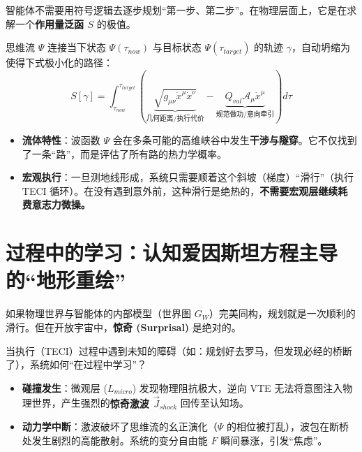 
智能体不需要用符号逻辑去逐步规划“第一步、第二步”。在物理层面上，它是在求解一个\textbf{作用量泛函 $S$} 的极值。

\begin{definition}[规划作用量方程]
    思维流 $\Psi$ 连接当下状态 $\Psi(\tau_{now})$ 与目标状态 $\Psi(\tau_{target})$ 的轨迹 $\gamma$，自动坍缩为使得下式极小化的路径：
    $$ S[\gamma] = \int_{\tau_{now}}^{\tau_{target}} \left( \underbrace{\sqrt{g_{\mu\nu} \dot{x}^\mu \dot{x}^\nu}}_{\text{几何距离/执行代价}} - \underbrace{Q_{val} \mathcal{A}_\mu \dot{x}^\mu}_{\text{规范做功/意向牵引}} \right) d\tau $$
\end{definition}

\begin{itemize}
    \item \textbf{流体特性}：波函数 $\Psi$ 会在多条可能的高维峡谷中发生\textbf{干涉与隧穿}。它不仅找到了一条“路”，而是评估了所有路的热力学概率。
    \item \textbf{宏观执行}：一旦测地线形成，系统只需要顺着这个斜坡（梯度）“滑行”（执行 TECI 循环）。在没有遇到意外前，这种滑行是绝热的，\textbf{不需要宏观层继续耗费意志力微操。}
\end{itemize}


\section{过程中的学习：认知爱因斯坦方程主导的“地形重绘”}
\label{sec:learning_in_process_cefe}

如果物理世界与智能体的内部模型（世界图 $G_W$）完美同构，规划就是一次顺利的滑行。但在开放宇宙中，\textbf{惊奇 (Surprisal)} 是绝对的。

当执行（TECI）过程中遇到未知的障碍（如：规划好去罗马，但发现必经的桥断了），系统如何“在过程中学习”？


\begin{itemize}
    \item \textbf{碰撞发生}：微观层 ($L_{micro}$) 发现物理阻抗极大，逆向 VTE 无法将意图注入物理世界，产生强烈的\textbf{惊奇激波 $\vec{J}_{shock}$} 回传至认知场。
    \item \textbf{动力学中断}：激波破坏了思维流的幺正演化（$\Psi$ 的相位被打乱），波包在断桥处发生剧烈的高能散射。系统的变分自由能 $F$ 瞬间暴涨，引发“焦虑”。
\end{itemize}


